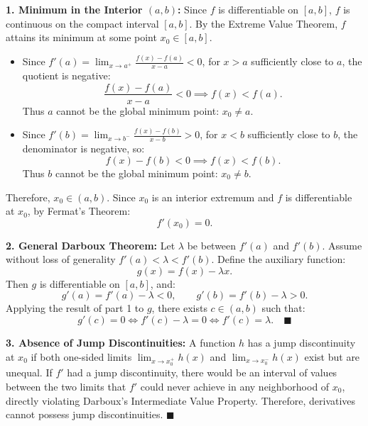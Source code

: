 \begin{solution}
\textbf{1. Minimum in the Interior $(a, b)$:}
Since $f$ is differentiable on $[a, b]$, $f$ is continuous on the compact interval $[a, b]$.
By the Extreme Value Theorem, $f$ attains its minimum at some point $x_0 \in [a, b]$.
\begin{itemize}[leftmargin=1.5em,itemsep=2pt]
  \item Since $f'(a) = \lim_{x \to a^+} \frac{f(x) - f(a)}{x - a} < 0$, for $x > a$ sufficiently close to $a$, the quotient is negative:
  \[
  \frac{f(x) - f(a)}{x - a} < 0 \implies f(x) < f(a).
  \]
  Thus $a$ cannot be the global minimum point: $x_0 \ne a$.
  \item Since $f'(b) = \lim_{x \to b^-} \frac{f(x) - f(b)}{x - b} > 0$, for $x < b$ sufficiently close to $b$, the denominator is negative, so:
  \[
  f(x) - f(b) < 0 \implies f(x) < f(b).
  \]
  Thus $b$ cannot be the global minimum point: $x_0 \ne b$.
\end{itemize}
Therefore, $x_0 \in (a, b)$.
Since $x_0$ is an interior extremum and $f$ is differentiable at $x_0$, by Fermat's Theorem:
\[
f'(x_0) = 0.
\]

\textbf{2. General Darboux Theorem:}
Let $\lambda$ be between $f'(a)$ and $f'(b)$. Assume without loss of generality $f'(a) < \lambda < f'(b)$.
Define the auxiliary function:
\[
g(x) = f(x) - \lambda x.
\]
Then $g$ is differentiable on $[a, b]$, and:
\[
g'(a) = f'(a) - \lambda < 0, \qquad g'(b) = f'(b) - \lambda > 0.
\]
Applying the result of part 1 to $g$, there exists $c \in (a, b)$ such that:
\[
g'(c) = 0 \iff f'(c) - \lambda = 0 \iff f'(c) = \lambda. \quad \blacksquare
\]

\textbf{3. Absence of Jump Discontinuities:}
A function $h$ has a jump discontinuity at $x_0$ if both one-sided limits $\lim_{x \to x_0^+} h(x)$ and $\lim_{x \to x_0^-} h(x)$ exist but are unequal.
If $f'$ had a jump discontinuity, there would be an interval of values between the two limits that $f'$ could never achieve in any neighborhood of $x_0$, directly violating Darboux's Intermediate Value Property.
Therefore, derivatives cannot possess jump discontinuities. \hfill $\blacksquare$
\end{solution}

